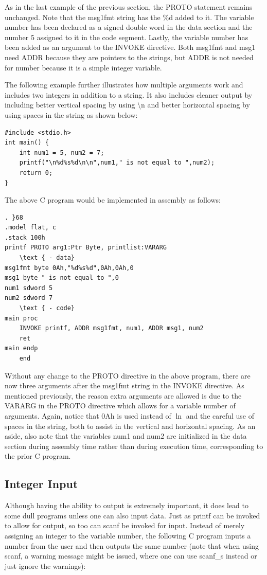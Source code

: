 \documentclass[10pt]{article}
\begin{document}
As in the last example of the previous section, the PROTO statement remains unchanged. Note that the msg1fmt string has the \%d added to it. The variable number has been declared as a signed double word in the data section and the number 5 assigned to it in the code segment. Lastly, the variable number has been added as an argument to the INVOKE directive. Both msg1fmt and msg1 need ADDR because they are pointers to the strings, but ADDR is not needed for number because it is a simple integer variable.

The following example further illustrates how multiple arguments work and includes two integers in addition to a string. It also includes cleaner output by including better vertical spacing by using \textbackslash n and better horizontal spacing by using spaces in the string as shown below:

\begin{verbatim}
#include <stdio.h>
int main() {
    int num1 = 5, num2 = 7;
    printf("\n%d%s%d\n\n",num1," is not equal to ",num2);
    return 0;
}
\end{verbatim}

The above C program would be implemented in assembly as follows:

\begin{verbatim}
. }68
.model flat, c
.stack 100h
printf PROTO arg1:Ptr Byte, printlist:VARARG
    \text { - data}
msg1fmt byte 0Ah,"%d%s%d",0Ah,0Ah,0
msg1 byte " is not equal to ",0
num1 sdword 5
num2 sdword 7
    \text { - code}
main proc
    INVOKE printf, ADDR msg1fmt, num1, ADDR msg1, num2
    ret
main endp
    end
\end{verbatim}

Without any change to the PROTO directive in the above program, there are now three arguments after the msg1fmt string in the INVOKE directive. As mentioned previously, the reason extra arguments are allowed is due to the VARARG in the PROTO directive which allows for a variable number of arguments. Again, notice that 0Ah is used instead of $\ln$ and the careful use of spaces in the string, both to assist in the vertical and horizontal spacing. As an aside, also note that the variables num1 and num2 are initialized in the data section during assembly time rather than during execution time, corresponding to the prior C program.

\subsection*{Integer Input}
Although having the ability to output is extremely important, it does lead to some dull programs unless one can also input data. Just as printf can be invoked to allow for output, so too can scanf be invoked for input. Instead of merely assigning an integer to the variable number, the following C program inputs a\\
number from the user and then outputs the same number (note that when using scanf, a warning message might be issued, where one can use scanf\_s instead or just ignore the warnings):
\end{document}
